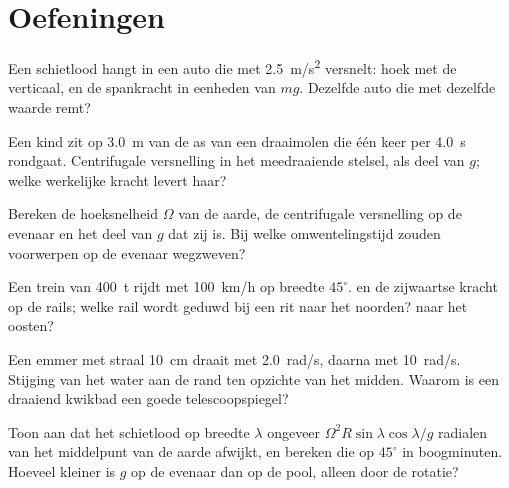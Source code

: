 \section{Oefeningen}

\begin{exercise}[$\star$]\label{exo:b1:non-inertial-frames:1}
Een schietlood hangt in een auto die met \qty{2.5}{m/s^2} versnelt: hoek met
de verticaal, en de spankracht in eenheden van $mg$. Dezelfde auto die met
dezelfde waarde remt?
\end{exercise}

\begin{exercise}[$\star$]\label{exo:b1:non-inertial-frames:2}
Een kind zit op \qty{3.0}{m} van de as van een draaimolen die één keer per
\qty{4.0}{s} rondgaat. Centrifugale versnelling in het meedraaiende stelsel, als
deel van $g$; welke werkelijke kracht levert haar?
\end{exercise}

\begin{exercise}[$\star$]\label{exo:b1:non-inertial-frames:3}
Bereken de hoeksnelheid $\Omega$ van de aarde, de centrifugale versnelling
op de evenaar en het deel van $g$ dat zij is. Bij welke omwentelingstijd zouden
voorwerpen op de evenaar wegzweven?
\end{exercise}

\begin{exercise}[$\star$]\label{exo:b1:non-inertial-frames:4}
Een trein van \qty{400}{t} rijdt met \qty{100}{km/h} op breedte $45^\circ$.
 en de zijwaartse kracht op de rails; welke rail
wordt geduwd bij een rit naar het noorden? naar het oosten?
\end{exercise}

\begin{exercise}[$\star\star$]\label{exo:b1:non-inertial-frames:5}
Een emmer met straal \qty{10}{cm} draait met \qty{2.0}{rad/s}, daarna met
\qty{10}{rad/s}. Stijging van het water aan de rand ten opzichte van het midden.
Waarom is een draaiend kwikbad een goede telescoopspiegel?
\end{exercise}

\begin{exercise}[$\star\star$]\label{exo:b1:non-inertial-frames:6}
Toon aan dat het schietlood op breedte $\lambda$ ongeveer
$\Omega^2R\sin\lambda\cos\lambda/g$ radialen van het middelpunt van de aarde afwijkt,
en bereken die op $45^\circ$ in boogminuten. Hoeveel kleiner is $g$ op de evenaar
dan op de pool, alleen door de rotatie?
\end{exercise}

